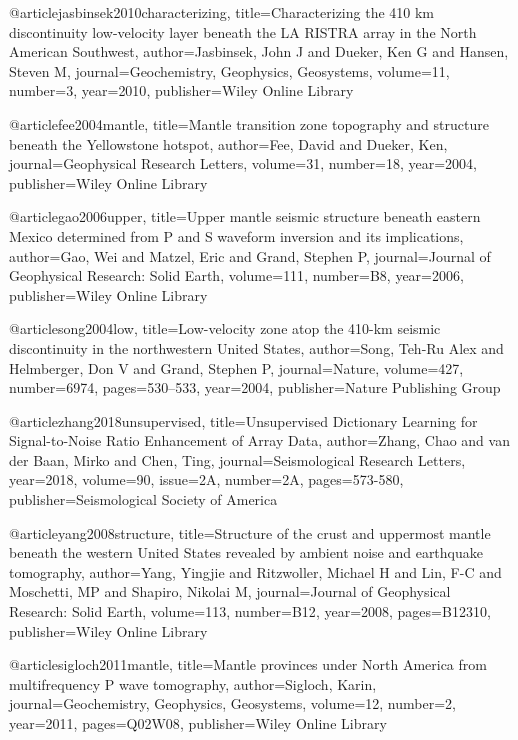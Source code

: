 @article{jasbinsek2010characterizing,
  title={Characterizing the 410 km discontinuity low-velocity layer beneath the LA RISTRA array in the North American Southwest},
  author={Jasbinsek, John J and Dueker, Ken G and Hansen, Steven M},
  journal={Geochemistry, Geophysics, Geosystems},
  volume={11},
  number={3},
  year={2010},
  publisher={Wiley Online Library}
}

@article{fee2004mantle,
  title={Mantle transition zone topography and structure beneath the Yellowstone hotspot},
  author={Fee, David and Dueker, Ken},
  journal={Geophysical Research Letters},
  volume={31},
  number={18},
  year={2004},
  publisher={Wiley Online Library}
}

@article{gao2006upper,
  title={Upper mantle seismic structure beneath eastern Mexico determined from P and S waveform inversion and its implications},
  author={Gao, Wei and Matzel, Eric and Grand, Stephen P},
  journal={Journal of Geophysical Research: Solid Earth},
  volume={111},
  number={B8},
  year={2006},
  publisher={Wiley Online Library}
}

@article{song2004low,
  title={Low-velocity zone atop the 410-km seismic discontinuity in the northwestern United States},
  author={Song, Teh-Ru Alex and Helmberger, Don V and Grand, Stephen P},
  journal={Nature},
  volume={427},
  number={6974},
  pages={530--533},
  year={2004},
  publisher={Nature Publishing Group}
}

@article{zhang2018unsupervised,
  title={Unsupervised Dictionary Learning for Signal-to-Noise Ratio Enhancement of Array Data},
  author={Zhang, Chao and van der Baan, Mirko and Chen, Ting},
  journal={Seismological Research Letters},
  year={2018},
  volume=90,
  issue=2A,
  number=2A,  
  pages={573-580},
  publisher={Seismological Society of America}
}

@article{yang2008structure,
  title={Structure of the crust and uppermost mantle beneath the western United States revealed by ambient noise and earthquake tomography},
  author={Yang, Yingjie and Ritzwoller, Michael H and Lin, F-C and Moschetti, MP and Shapiro, Nikolai M},
  journal={Journal of Geophysical Research: Solid Earth},
  volume={113},
  number={B12},
  year={2008},
  pages={B12310},
  publisher={Wiley Online Library}
}

@article{sigloch2011mantle,
  title={Mantle provinces under North America from multifrequency P wave tomography},
  author={Sigloch, Karin},
  journal={Geochemistry, Geophysics, Geosystems},
  volume={12},
  number={2},
  year={2011},
  pages={Q02W08},
  publisher={Wiley Online Library}
}





